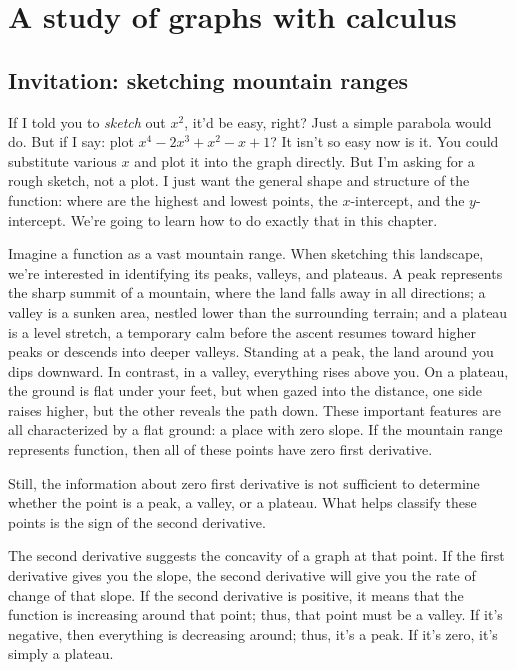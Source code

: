 \chapter{A study of graphs with calculus}
\label{sec:calculus-and-geometry}

\section{Invitation: sketching mountain ranges}

If I told you to \emph{sketch} out $x^2$, it'd be easy, right? Just a simple parabola would do. But if I say: plot $x^4 - 2x^3 + x^2 - x + 1$? It isn't so easy now is it. You could substitute various $x$ and plot it into the graph directly. But I'm asking for a rough sketch, not a plot. I just want the general shape and structure of the function: where are the highest and lowest points, the $x$-intercept, and the $y$-intercept. We're going to learn how to do exactly that in this chapter.

Imagine a function as a vast mountain range. When sketching this landscape, we're interested in identifying its peaks, valleys, and plateaus. A peak represents the sharp summit of a mountain, where the land falls away in all directions; a valley is a sunken area, nestled lower than the surrounding terrain; and a plateau is a level stretch, a temporary calm before the ascent resumes toward higher peaks or descends into deeper valleys. Standing at a peak, the land around you dips downward. In contrast, in a valley, everything rises above you. On a plateau, the ground is flat under your feet, but when gazed into the distance, one side raises higher, but the other reveals the path down. These important features are all characterized by a flat ground: a place with zero slope. If the mountain range represents function, then all of these points have zero first derivative.

Still, the information about zero first derivative is not sufficient to determine whether the point is a peak, a valley, or a plateau. What helps classify these points is the sign of the second derivative.

The second derivative suggests the concavity of a graph at that point. If the first derivative gives you the slope, the second derivative will give you the rate of change of that slope. If the second derivative is positive, it means that the function is increasing around that point; thus, that point must be a valley. If it's negative, then everything is decreasing around; thus, it's a peak. If it's zero, it's simply a plateau.

